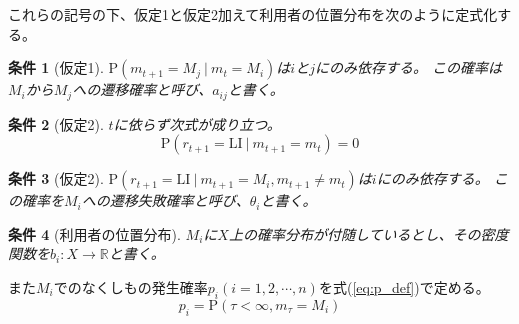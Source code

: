\documentclass{jarticle}
\numberwithin{equation}{section}
\numberwithin{table}{section}
\theoremstyle{plain}
\newtheorem{joken}{条件}
\begin{document}
これらの記号の下、仮定1と仮定2加えて利用者の位置分布を次のように定式化する。
\begin{joken}[仮定1]
    $ \mathrm{P}(m_{t+1}=M_j\ |\ m_t=M_i) $は$i$と$j$にのみ依存する。
    この確率は$M_i$から$M_j$への遷移確率と呼び、$a_{i j}$と書く。
\end{joken}
\begin{joken}[仮定2]
    $t$に依らず次式が成り立つ。
    \begin{equation}
        \mathrm{P}(r_{t+1} = \mathrm{LI}\ |\ m_{t+1}=m_t) = 0
    \end{equation}
\end{joken}
\begin{joken}[仮定2]
    $ \mathrm{P}(r_{t+1} = \mathrm{LI}\ |\ m_{t+1}=M_i , m_{t+1} \ne m_t) $は$i$にのみ依存する。
    この確率を$M_i$への遷移失敗確率と呼び、$\theta_i$と書く。
\end{joken}
\begin{joken}[利用者の位置分布]
    $M_i$に$X$上の確率分布が付随しているとし、その密度関数を$ b_i:X\rightarrow\mathbb{R} $と書く。
\end{joken}
また$M_i$でのなくしもの発生確率$p_i(i=1,2,\cdots,n)$を式(\ref{eq:p_def})で定める。
\begin{equation}
    \label{eq:p_def}
    p_i =\mathrm{P}(\tau < \infty , m_\tau = M_i)
\end{equation}
\end{document}
